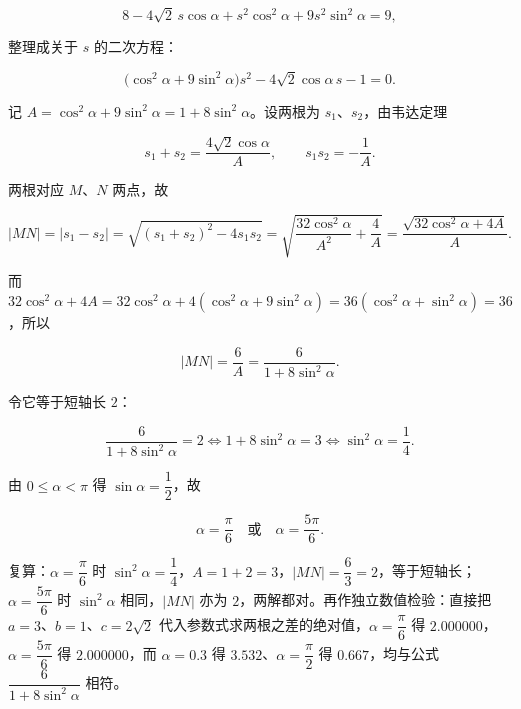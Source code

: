 \begin{answer}
\nopagebreak[4]
\[
8-4\sqrt2\,s\cos\alpha+s^2\cos^2\alpha+9s^2\sin^2\alpha=9,
\]

整理成关于 $s$ 的二次方程：

\nopagebreak[4]
\[
\bigl(\cos^2\alpha+9\sin^2\alpha\bigr)s^2-4\sqrt2\cos\alpha\,s-1=0.
\]

记 $A=\cos^2\alpha+9\sin^2\alpha=1+8\sin^2\alpha$。设两根为 $s_1$、$s_2$，由韦达定理

\nopagebreak[4]
\[
s_1+s_2=\frac{4\sqrt2\cos\alpha}{A},\qquad s_1s_2=-\frac1A.
\]

两根对应 $M$、$N$ 两点，故

\nopagebreak[4]
\[
\lvert MN\rvert=\lvert s_1-s_2\rvert=\sqrt{(s_1+s_2)^2-4s_1s_2}
=\sqrt{\frac{32\cos^2\alpha}{A^2}+\frac4A}
=\frac{\sqrt{32\cos^2\alpha+4A}}{A}.
\]

而 $32\cos^2\alpha+4A=32\cos^2\alpha+4(\cos^2\alpha+9\sin^2\alpha)=36(\cos^2\alpha+\sin^2\alpha)=36$，所以

\nopagebreak[4]
\[
\lvert MN\rvert=\frac{6}{A}=\frac{6}{1+8\sin^2\alpha}.
\]

令它等于短轴长 $2$：

\nopagebreak[4]
\[
\frac{6}{1+8\sin^2\alpha}=2\iff 1+8\sin^2\alpha=3\iff\sin^2\alpha=\frac14.
\]

由 $0\leqslant\alpha<\pi$ 得 $\sin\alpha=\dfrac12$，故

\nopagebreak[4]
\[
\alpha=\frac\pi6\quad\text{或}\quad\alpha=\frac{5\pi}{6}.
\]

复算：$\alpha=\dfrac\pi6$ 时 $\sin^2\alpha=\dfrac14$，$A=1+2=3$，$\lvert MN\rvert=\dfrac63=2$，等于短轴长；$\alpha=\dfrac{5\pi}{6}$ 时 $\sin^2\alpha$ 相同，$\lvert MN\rvert$ 亦为 $2$，两解都对。再作独立数值检验：直接把 $a=3$、$b=1$、$c=2\sqrt2$ 代入参数式求两根之差的绝对值，$\alpha=\dfrac\pi6$ 得 $2.000000$，$\alpha=\dfrac{5\pi}{6}$ 得 $2.000000$，而 $\alpha=0.3$ 得 $3.532$、$\alpha=\dfrac\pi2$ 得 $0.667$，均与公式 $\dfrac{6}{1+8\sin^2\alpha}$ 相符。


\end{answer}
